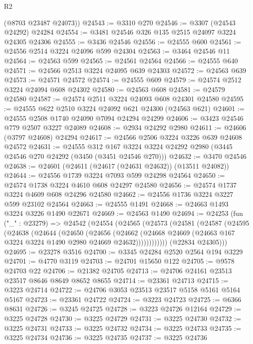 \begin{lexlean}{R2}
\begin{coremodule}
      (@8703 @23487 @24073))
@24543 := @3310 @270
@24546 := @3307 (@24543 @24292) @24284
@24554 := @3481 @24546 @326 @135 @2515 @24097 @3224 @24305 @24306
@24555 := @3436 @24546
@24556 := @24555 @600
@24561 := @24556 @2514 @3224 @24096 @599 @24304
@24563 := @3464 @24546 @11
@24564 := @24563 @599
@24565 := @24561 @24564
@24566 := @24555 @640
@24571 := @24566 @2513 @3224 @24095 @639 @24303
@24572 := @24563 @639
@24573 := @24571 @24572
@24574 := @24555 @609
@24579 := @24574 @2512 @3224 @24094 @608 @24302
@24580 := @24563 @608
@24581 := @24579 @24580
@24587 := @24574 @2511 @3224 @24093 @608 @24301 @24580
@24595 := @24555 @622 @2510 @3224 @24092 @621 @24300 (@24563 @621)
@24601 := @24555 @2508 @1740 @24090 @7094 @24294 @24299
@24606 := @3423 @24546 @779 @2507 @3227 @24089
@24608 := @2934 @24292 @2980
@24611 := @24606 (@3797 @24608) @24294
@24617 := @24566 @2506 @3224 @3226 @639 @24608 @24572
@24631 := @24555
    @312
    @167
    @3224
    @3224
    @24292
    @2980
    (@3445 @24546 @270 @24292 (@3450 (@3451 @24546 @270)))
@24632 := @3470 @24546
@24638 := @24601 (@24611 (@24617 (@24631 @24632)) (@13511 @24082))
@24644 := @24556 @1739 @3224 @7093 @599 @24298 @24564
@24650 := @24574 @1738 @3224 @4610 @608 @24297 @24580
@24656 := @24574 @1737 @3224 @4609 @608 @24296 @24580
@24662 := @24556 @1736 @3224 @3227 @599 @23102 @24564
@24663 := @24555 @1491
@24668 := @24663 @1493 @3224 @3226 @1490 @22671
@24669 := @24563 @1490
@24694 := @24253
    (fun ("_" : @23279) =>
    @24542
      (@24554
        (@24565
          (@24573
            (@24581
              (@24587
                (@24595
                  (@24638
                    (@24644
                      (@24650
                        (@24656
                          (@24662
                            (@24668
                              @24669
                              (@24663 @167 @3224 @3224 @1490 @2980 @24669 @24632))))))))))))
        (@22834 @24305)))
@24695 := @23278 @3516
@24700 := @3345 @24284 @2520 @2564 @194 @3229
@24701 := @4770 @3119
@24703 := @24701 @15650 @122
@24705 := @9578 @24703 @22
@24706 := @21382 @24705
@24713 := @24706 @24161 @23513 @23517 @8646 @8649 @8652 @8655
@24714 := @23361 @24713
@24715 := @3223 @24714
@24722 := @24706 @3053 @23513 @23517 @5158 @5161 @5164 @5167
@24723 := @23361 @24722
@24724 := @3223 @24723
@24725 := @6366 @8631
@24726 := @3245 @24725
@24728 := @3223 @24726 @12164
@24729 := @3225 @24728
@24730 := @3225 @24729
@24731 := @3225 @24730
@24732 := @3225 @24731
@24733 := @3225 @24732
@24734 := @3225 @24733
@24735 := @3225 @24734
@24736 := @3225 @24735
@24737 := @3225 @24736

\end{coremodule}
\end{lexlean}
